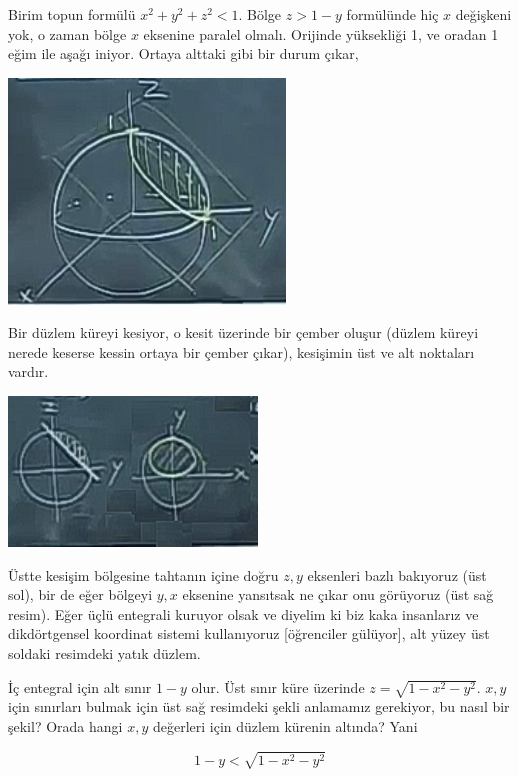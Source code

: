 \documentclass[12pt,fleqn]{article}\usepackage{../../common}
\begin{document}
Birim topun formülü $x^2 + y^2 + z^2 < 1$. Bölge $z > 1-y$ formülünde hiç
$x$ değişkeni yok, o zaman bölge $x$ eksenine paralel olmalı. Orijinde
yüksekliği 1, ve oradan 1 eğim ile aşağı iniyor. Ortaya alttaki gibi bir
durum çıkar,

\begin{center}
\includegraphics[height=6cm]{25_13.png}
\end{center}

Bir düzlem küreyi kesiyor, o kesit üzerinde bir çember oluşur (düzlem
küreyi nerede keserse kessin ortaya bir çember çıkar), kesişimin üst ve alt
noktaları vardır. 

\begin{center}
\includegraphics[height=4cm]{25_14.png}
\end{center}

Üstte kesişim bölgesine tahtanın içine doğru $z,y$ eksenleri bazlı
bakıyoruz (üst sol), bir de eğer bölgeyi $y,x$ eksenine yansıtsak ne çıkar
onu görüyoruz (üst sağ resim). Eğer üçlü entegrali kuruyor olsak ve diyelim
ki biz kaka insanlarız ve dikdörtgensel koordinat sistemi kullanıyoruz
[öğrenciler gülüyor], alt yüzey üst soldaki resimdeki yatık düzlem. 

İç entegral için alt sınır $1-y$ olur. Üst sınır küre üzerinde
$z = \sqrt{1-x^2-y^2}$. $x,y$ için sınırları bulmak için üst sağ resimdeki
şekli anlamamız gerekiyor, bu nasıl bir şekil? Orada hangi $x,y$ değerleri
için düzlem kürenin altında? Yani 

$$ 1-y < \sqrt{1-x^2-y^2} $$
\end{document}
